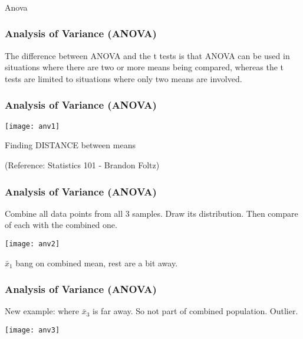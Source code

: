 \begin{frame}[fragile]\frametitle{}
\begin{center}
{\Large Anova}
\end{center}
\end{frame}

\begin{frame}[fragile]\frametitle{Analysis of Variance (ANOVA)}
The difference between ANOVA and the t tests is that ANOVA can 
be  used  in  situations  where  there  are  two  or  more  means  being 
compared, whereas the t tests are limited to situations where only 
two means are involved. 
\end{frame}

\begin{frame}[fragile]\frametitle{Analysis of Variance (ANOVA)}
\begin{center}
\texttt{[image: anv1]}
\end{center}
Finding DISTANCE between means

\tiny{(Reference: Statistics 101 - Brandon Foltz)}

\end{frame}

\begin{frame}[fragile]\frametitle{Analysis of Variance (ANOVA)}
Combine all data points from all 3 samples. Draw its distribution. Then compare of each with the combined one.
\begin{center}
\texttt{[image: anv2]}
\end{center}
$\bar{x}_1$ bang on combined mean, rest are a bit away.
\end{frame}

\begin{frame}[fragile]\frametitle{Analysis of Variance (ANOVA)}
New example: where $\bar{x}_3$  is far away. So not part of combined population. Outlier.

\begin{center}
\texttt{[image: anv3]}
\end{center}

\end{frame}

